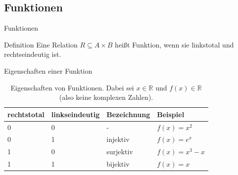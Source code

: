 \documentclass[18pt]{beamer}
\begin{document}
    \subsection{Funktionen}
    \begin{frame}{Funktionen}
        \begin{block}{Definition}
                Eine Relation $R \subseteq A \times B$ heißt Funktion, wenn sie linkstotal und rechtseindeutig ist.
        \end{block}
        \begin{block}{Eigenschaften einer Funktion}
            \begin{table}
                \centering
                \caption{Eigenschaften von Funktionen. Dabei sei $x \in \mathbb{R}$ und $f\left( x\right)\in \mathbb{R}$ (also keine komplexen Zahlen).}
                \begin{tabular}{llll}
                    \toprule
                    rechtstotal & linkseindeutig & Bezeichnung & Beispiel\\
                    \midrule
                    0 & 0 & - & $f\left( x\right) = x^2$\\
                    0 & 1 & injektiv & $f\left( x \right) = e^x$\\
                    1 & 0 & surjektiv & $f\left( x \right) = x^3 - x$\\
                    1 & 1 & bijektiv & $f\left( x\right) = x$\\
                    \bottomrule
                \end{tabular}
            \end{table}
        \end{block}
    \end{frame}
\end{document}
